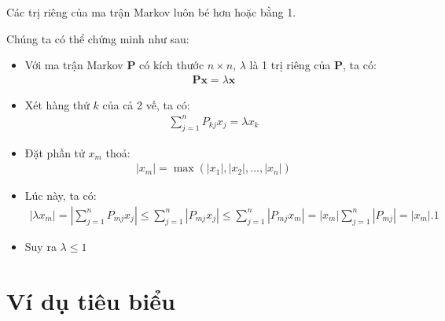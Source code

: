 \begin{theovn}
Các trị riêng của ma trận Markov luôn bé hơn hoặc bằng 1.
\end{theovn}
\begin{proofvn}
    Chúng ta có thể chứng minh như sau:

    \begin{itemize}
        \item  Với ma trận Markov $\mathbf{P}$ có kích thước $n \times n$, $\lambda$ là 1 trị riêng của $\mathbf{P}$, ta có: 
        \begin{align}
            \mathbf{P}\textbf{x} = \lambda \textbf{x}
        \end{align}
    
        \item Xét hàng thứ $k$ của cả 2 vế, ta có:
        \begin{align}
            \sum_{j = 1}^n P_{kj}x_j = \lambda x_k
        \end{align}
    
        \item Đặt phần tử $x_m$ thoả:
        \begin{align}
            |x_m| = \max (|x_1|, |x_2|, ... ,|x_n|)
        \end{align}

        \item Lúc này, ta có:
        \begin{align}
            |\lambda x_m| = \left|\sum_{j = 1}^n P_{mj}x_j\right|
            \leq \sum_{j = 1}^n |P_{mj}x_j|           
            \leq \sum_{j = 1}^n |P_{mj}x_m|           
            = |x_m|\sum_{j = 1}^n |P_{mj}|         
            = |x_m|.1
        \end{align}
        
        \item Suy ra $\lambda \leq 1$
    \end{itemize}
\end{proofvn}
\section{Ví dụ tiêu biểu}

